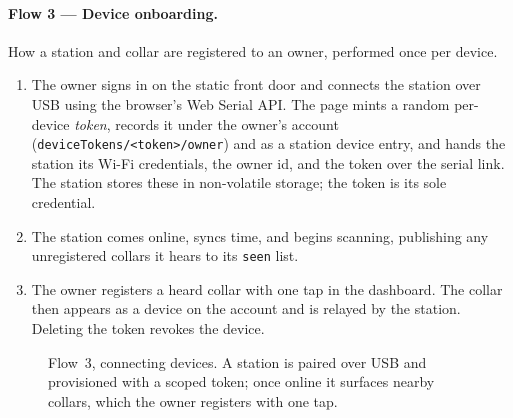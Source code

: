 \paragraph{Flow 3 --- Device onboarding.}
How a station and collar are registered to an owner, performed once per device.
\begin{enumerate}[leftmargin=1.6em,itemsep=2pt]
  \item The owner signs in on the static front door and connects the station over USB using the
        browser's Web Serial API. The page mints a random per-device \emph{token}, records it under
        the owner's account (\texttt{deviceTokens/<token>/owner}) and as a station device entry, and
        hands the station its Wi-Fi credentials, the owner id, and the token over the serial link.
        The station stores these in non-volatile storage; the token is its sole credential.
  \item The station comes online, syncs time, and begins scanning, publishing any unregistered
        collars it hears to its \texttt{seen} list.
  \item The owner registers a heard collar with one tap in the dashboard. The collar then appears as a
        device on the account and is relayed by the station. Deleting the token revokes the device.
\end{enumerate}

\begin{figure}[ht]\centering
  \caption{Flow~3, connecting devices. A station is paired over USB and provisioned with a scoped
           token; once online it surfaces nearby collars, which the owner registers with one tap.}
  \label{fig:onboarding}
\end{figure}

